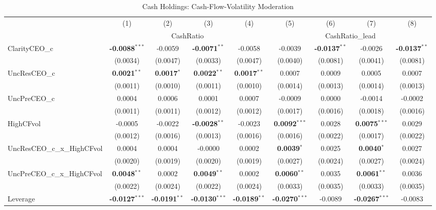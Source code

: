 \documentclass[11pt,a4paper]{article}
\begin{document}
\begin{table}[htbp]
\centering
\caption{Cash Holdings: Cash-Flow-Volatility Moderation}
\label{tab:h1_3_cfvol}
\scriptsize
\begin{tabular}{lcccccccc}
\toprule
 & (1) & (2) & (3) & (4) & (5) & (6) & (7) & (8) \\
 & \multicolumn{4}{c}{CashRatio} & \multicolumn{4}{c}{CashRatio\_lead} \\
\cmidrule(lr){2-5} \cmidrule(lr){6-9}
\midrule
ClarityCEO\_c & \textbf{-0.0088}$^{***}$ & -0.0059 & \textbf{-0.0071}$^{**}$ & -0.0058 & -0.0039 & \textbf{-0.0137}$^{**}$ & -0.0026 & \textbf{-0.0137}$^{**}$ \\
 & (0.0034) & (0.0047) & (0.0033) & (0.0047) & (0.0040) & (0.0081) & (0.0041) & (0.0081) \\
UncResCEO\_c & \textbf{0.0021}$^{**}$ & \textbf{0.0017}$^{*}$ & \textbf{0.0022}$^{**}$ & \textbf{0.0017}$^{**}$ & 0.0007 & 0.0009 & 0.0005 & 0.0007 \\
 & (0.0011) & (0.0010) & (0.0011) & (0.0010) & (0.0014) & (0.0013) & (0.0014) & (0.0013) \\
UncPreCEO\_c & 0.0004 & 0.0006 & 0.0001 & 0.0007 & -0.0009 & 0.0000 & -0.0014 & -0.0002 \\
 & (0.0011) & (0.0011) & (0.0012) & (0.0012) & (0.0017) & (0.0016) & (0.0018) & (0.0016) \\
HighCFvol & -0.0005 & -0.0022 & \textbf{-0.0028}$^{**}$ & -0.0023 & \textbf{0.0092}$^{***}$ & 0.0028 & \textbf{0.0075}$^{***}$ & 0.0029 \\
 & (0.0012) & (0.0016) & (0.0013) & (0.0016) & (0.0016) & (0.0022) & (0.0017) & (0.0022) \\
UncResCEO\_c\_x\_HighCFvol & 0.0004 & 0.0004 & -0.0000 & 0.0002 & \textbf{0.0039}$^{*}$ & 0.0025 & \textbf{0.0040}$^{*}$ & 0.0027 \\
 & (0.0020) & (0.0019) & (0.0020) & (0.0019) & (0.0027) & (0.0024) & (0.0027) & (0.0024) \\
UncPreCEO\_c\_x\_HighCFvol & \textbf{0.0048}$^{**}$ & 0.0002 & \textbf{0.0049}$^{**}$ & 0.0002 & \textbf{0.0060}$^{**}$ & 0.0035 & \textbf{0.0061}$^{**}$ & 0.0036 \\
 & (0.0022) & (0.0024) & (0.0022) & (0.0024) & (0.0033) & (0.0035) & (0.0033) & (0.0035) \\
\midrule
Leverage & \textbf{-0.0127}$^{***}$ & \textbf{-0.0191}$^{**}$ & \textbf{-0.0130}$^{***}$ & \textbf{-0.0189}$^{**}$ & \textbf{-0.0270}$^{***}$ & -0.0089 & \textbf{-0.0267}$^{***}$ & -0.0083 \\

\end{tabular}
\end{table}
\end{document}
